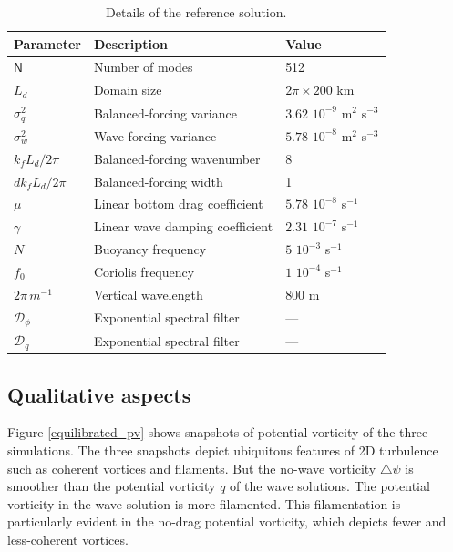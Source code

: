 \documentclass[12pt]{article}
\newcommand{\lap}{\triangle}
\newcommand{\?}{\stackrel{?}{=}}
\newcommand{\D}{\mathcal{D}}
\begin{document}
\begin{table}
 \begin{center}
   \caption{Details of the reference solution.}
   \label{parameters_reference}
   \begin{tabular}{ l | l | l }
     \hline
      Parameter & Description & Value \\
      \hline
      $\mathsf{N}$   & Number of modes &  512  \\
      $L_d$ & Domain size & $2\pi\times 200$ km \\
      $\sigma_q^2$ & Balanced-forcing variance & $3.62\,\,10^{-9}$ m$^2$ s$^{-3}$ \\
      $\sigma_w^2$ & Wave-forcing variance & $5.78\,\,10^{-8}$ m$^2$ s$^{-3}$ \\
      $k_f L_d/2\pi$    & Balanced-forcing wavenumber & 8 \\
      ${dk}_f L_d/2\pi$    & Balanced-forcing width &  1 \\
      $\mu$ & Linear bottom drag coefficient & $5.78\,\,10^{-8}$ s$^{-1}$ \\
      $\gamma$ & Linear wave damping coefficient & $2.31\,\,10^{-7}$ s$^{-1}$ \\
      $N$ & Buoyancy frequency &  $5\,\,10^{-3}$ s$^{-1}$\\
      $f_0$ & Coriolis frequency &  $1\,\,10^{-4}$ s$^{-1}$\\
      $2\pi\,m^{-1}$ & Vertical wavelength &  $800$ m\\
      $\D_\phi$ & Exponential spectral filter & ---\\
      $\D_q$ & Exponential spectral filter & ---\\
   \end{tabular}
 \end{center}
\end{table}


\subsection{Qualitative aspects}
Figure \ref{equilibrated_pv} shows snapshots of potential vorticity of the three simulations.
The three snapshots depict ubiquitous features of 2D turbulence such as coherent vortices
and filaments. But the no-wave vorticity $\lap\psi$ is smoother than the potential
vorticity $q$ of the wave solutions. The potential vorticity in the wave solution is
more filamented. This filamentation is particularly evident in the no-drag potential
vorticity, which depicts fewer and less-coherent vortices.
\end{document}
